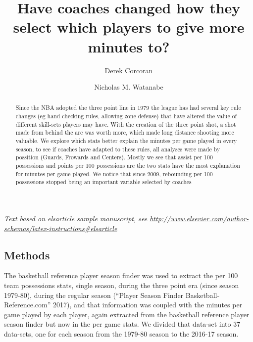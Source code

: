 \documentclass[]{elsarticle} %
\begin{document}
\begin{frontmatter}

  \title{Have coaches changed how they select which players to give more minutes
to?}
    \author[Pontificia Universidad Catolica de Chile]{Derek Corcoran}
    \author[The University of Mississippi]{Nicholas M. Watanabe}
  
      \address[Some Institute of Technology]{Department, Street, City, State, Zip}
    \address[Another University]{Department, Street, City, State, Zip}
  
  \begin{abstract}
  Since the NBA adopted the three point line in 1979 the league has had
  several key rule changes (eg hand checking rules, allowing zone defense)
  that have altered the value of different skill-sets players may have.
  With the creation of the three point shot, a shot made from behind the
  arc was worth more, which made long distance shooting more valuable. We
  explore which stats better explain the minutes per game played in every
  season, to see if coaches have adapted to these rules, all analyses were
  made by possition (Guards, Frowards and Centers). Mostly we see that
  assist per 100 possessions and points per 100 possessions are the two
  stats have the most explanation for minutes per game played. We notice
  that since 2009, rebounding per 100 possessions stopped being an
  important variable selected by coaches
  \end{abstract}
  
 \end{frontmatter}

\emph{Text based on elsarticle sample manuscript, see
\url{http://www.elsevier.com/author-schemas/latex-instructions\#elsarticle}}

\subsection{Methods}\label{methods}

The basketball reference player season finder was used to extract the
per 100 team possessions stats, single season, during the three point
era (since season 1979-80), during the regular season (``Player Season
Finder Basketball-Reference.com'' 2017), and that information was
coupled with the minutes per game played by each player, again extracted
from the basketball reference player season finder but now in the per
game stats. We divided that data-set into 37 data-sets, one for each
season from the 1979-80 season to the 2016-17 season.
\end{document}
